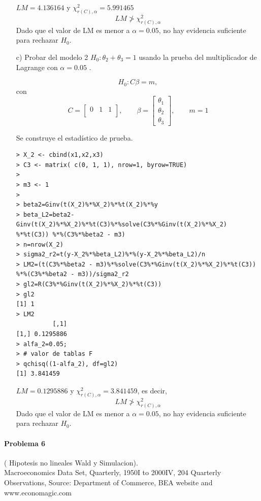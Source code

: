 \documentclass[12pt,a4paper]{report}
\begin{document}
\begin{enumerate}
$LM=4.136164$ y $\chi_{r(C), \alpha}^{2} =  5.991465$
\[ LM \ngtr \chi_{r(C), \alpha}^{2} \]
Dado que el valor de LM es menor a $\alpha =0.05$, no 
hay evidencia suficiente para rechazar $H_{0}$. 
 

\item[c)] Probar del modelo 2 $H_0 : \theta_2 + \theta_3 = 1$ usando la prueba del multiplicador de Lagrange con $\alpha = 0.05$ .

\[H_0 : C\beta = m,\]
con
\[
C=\begin{bmatrix}
0 & 1 & 1 \\
\end{bmatrix}, \qquad
\beta = \begin{bmatrix}
\theta_1 \\ \theta_2 \\ \theta_3 
\end{bmatrix}, \qquad
m=1
\]

Se construye el estadístico de prueba.
\begin{verbatim}
> X_2 <- cbind(x1,x2,x3)           
> C3 <- matrix( c(0, 1, 1), nrow=1, byrow=TRUE)
> 
> m3 <- 1
> 
> beta2=Ginv(t(X_2)%*%X_2)%*%t(X_2)%*%y
> beta_L2=beta2-Ginv(t(X_2)%*%X_2)%*%t(C3)%*%solve(C3%*%Ginv(t(X_2)%*%X_2)
%*%t(C3)) %*%(C3%*%beta2 - m3)
> n=nrow(X_2)
> sigma2_r2=t(y-X_2%*%beta_L2)%*%(y-X_2%*%beta_L2)/n
> LM2=(t(C3%*%beta2 - m3)%*%solve(C3%*%Ginv(t(X_2)%*%X_2)%*%t(C3))
%*%(C3%*%beta2 - m3))/sigma2_r2
> gl2=R(C3%*%Ginv(t(X_2)%*%X_2)%*%t(C3))
> gl2
[1] 1
> LM2
          [,1]
[1,] 0.1295886
> alfa_2=0.05; 
> # valor de tablas F
> qchisq((1-alfa_2), df=gl2) 
[1] 3.841459
\end{verbatim}


$LM=0.1295886$ y $\chi_{r(C), \alpha}^{2} =  3.841459$, es decir,
\[ LM \ngtr \chi_{r(C), \alpha}^{2} \]
Dado que el valor de LM es menor a $\alpha =0.05$, no 
hay evidencia suficiente para rechazar $H_{0}$. 

\end{enumerate}



\paragraph{Problema 6}  ( Hipotesis no lineales Wald y Simulacion).\\

Macroeconomics Data Set, Quarterly, 1950I to 2000IV, 204 Quarterly Observations, Source: Department of
Commerce, BEA website and www.economagic.com\\
\end{document}
